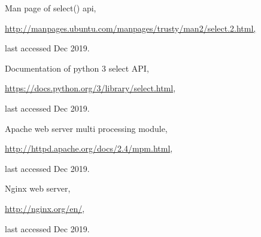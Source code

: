 \begin{multicols}{2}
\begin{thebibliography}{99}
 Man page of select() api,

\url{http://manpages.ubuntu.com/manpages/trusty/man2/select.2.html,}

last accessed Dec 2019.

 Documentation of python 3 select API, 

\url{https://docs.python.org/3/library/select.html}, 

last accessed Dec 2019.

 Apache web server multi processing module,

\url{http://httpd.apache.org/docs/2.4/mpm.html},

 last accessed Dec 2019.
 
 Nginx web server, 

\url{http://nginx.org/en/},

last accessed Dec 2019.

\end{thebibliography}
\end{multicols}


